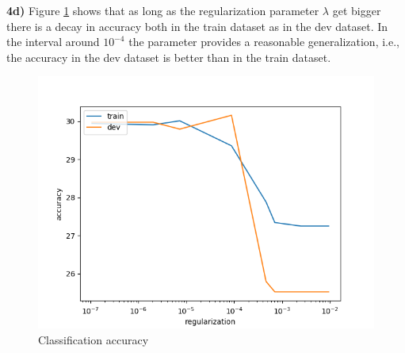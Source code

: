 \documentclass{article}
\begin{document}
\textbf{4d)} Figure \ref{results} shows that as long as the regularization parameter $\lambda$ get bigger there is a decay in accuracy both in the train dataset as in the dev dataset. In the interval around $10^{-4}$ the parameter provides a reasonable generalization, i.e., the accuracy in the dev dataset is better than in the train dataset.
\begin{figure}
\begin{center}
\includegraphics[scale=1]{q4_reg_v_acc.png}
\end{center}
\caption{Classification accuracy}
\label{results}
\end{figure}
\end{document}
